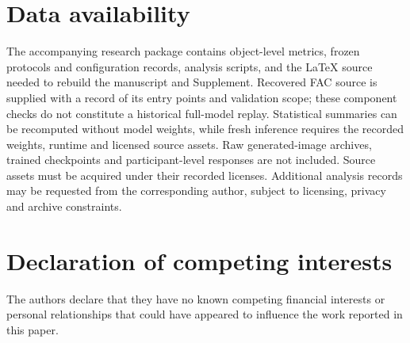 \documentclass[times,twocolumn,final]{elsarticle}
\begin{document}
\section*{Data availability}

The accompanying research package contains object-level metrics, frozen protocols and configuration records, analysis scripts, and the LaTeX source needed to rebuild the manuscript and Supplement. Recovered FAC source is supplied with a record of its entry points and validation scope; these component checks do not constitute a historical full-model replay. Statistical summaries can be recomputed without model weights, while fresh inference requires the recorded weights, runtime and licensed source assets. Raw generated-image archives, trained checkpoints and participant-level responses are not included. Source assets must be acquired under their recorded licenses. Additional analysis records may be requested from the corresponding author, subject to licensing, privacy and archive constraints.

\section*{Declaration of competing interests}

The authors declare that they have no known competing financial interests or personal relationships that could have appeared to influence the work reported in this paper.
\end{document}

